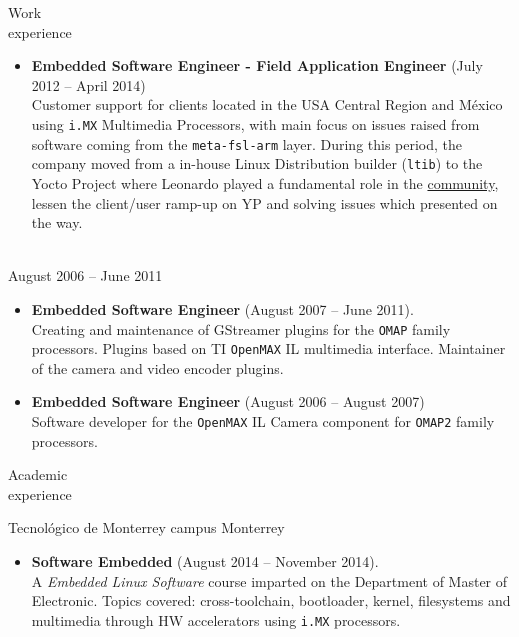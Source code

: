 \documentclass{resume}
\def\itesm{Tecnol\'ogico de Monterrey campus Monterrey}
\begin{document}
\begin{category}{Work \\experience}
\begin{itemize}
\item \textbf{Embedded Software Engineer - Field Application Engineer} (July 2012 -- April 2014)\\
  Customer support for clients located in the USA Central Region and M\'exico using
  \texttt{i.MX} Multimedia Processors, with main focus on issues raised from software
  coming from the \texttt{meta-fsl-arm} layer. During this period, the company
  moved from a in-house Linux Distribution builder (\texttt{ltib}) to the Yocto Project
  where Leonardo played a fundamental role in the
  \href{https://community.nxp.com/people/LeonardoSandovalGonzalez}{community},
  lessen the client/user ramp-up on YP and solving issues which presented on the way.
\end{itemize}

\\
August 2006 -- June 2011
\begin{itemize}
\item \textbf{Embedded Software Engineer} (August 2007 -- June 2011).\\
  Creating and maintenance of GStreamer plugins for the \texttt{OMAP} family
  processors. Plugins based on TI \texttt{OpenMAX} IL multimedia interface.
  Maintainer of the camera and video encoder plugins.
\item \textbf{Embedded Software Engineer} (August 2006 -- August 2007)\\
  Software developer for the \texttt{OpenMAX} IL Camera component for
  \texttt{OMAP2} family processors.
\end{itemize}
\end{category}

\begin{category}{Academic \\experience}

\citem\itesm\\
\begin{itemize}
\item \textbf{Software Embedded} (August 2014 -- November 2014).\\
  A \textit{Embedded Linux Software} course imparted on the Department of
  Master of Electronic. Topics covered: cross-toolchain, bootloader,
  kernel, filesystems and multimedia through HW accelerators using
  \texttt{i.MX} processors.
\end{itemize}
\end{category}
\end{document}
